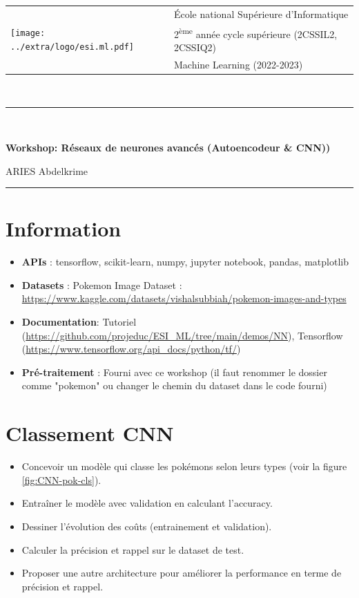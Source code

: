 \documentclass[11pt, a4paper]{article}
\begin{document}

\noindent
\begin{tabular}{ll}
\multirow{3}{*}{\texttt{[image: ../extra/logo/esi.ml.pdf]}} & \'Ecole national Supérieure d'Informatique\\
& 2\textsuperscript{ème} année cycle supérieure (2CSSIL2, 2CSSIQ2)\\
& Machine Learning (2022-2023)
\end{tabular}\\[.25cm]
\noindent\rule{\textwidth}{1pt}\\%
\begin{center}
{\LARGE \textbf{Workshop: Réseaux de neurones avanc\'es (Autoencodeur \& CNN))}}
\begin{flushright}
	ARIES Abdelkrime
\end{flushright}
\end{center}
\noindent\rule{\textwidth}{1pt}

\section*{Information}

\begin{itemize}
	\item \textbf{APIs} : tensorflow, scikit-learn, numpy, jupyter notebook, pandas, matplotlib
	\item \textbf{Datasets} : Pokemon Image Dataset : {\scriptsize\url{https://www.kaggle.com/datasets/vishalsubbiah/pokemon-images-and-types}}
	\item \textbf{Documentation}: Tutoriel ({\scriptsize \url{https://github.com/projeduc/ESI_ML/tree/main/demos/NN}}), Tensorflow ({\scriptsize \url{https://www.tensorflow.org/api_docs/python/tf/}})
	\item \textbf{Pré-traitement} : Fourni avec ce workshop (il faut renommer le dossier comme "pokemon" ou changer le chemin du dataset dans le code fourni)
\end{itemize}

\section{Classement CNN}

\begin{itemize}
	\item Concevoir un modèle qui classe les pokémons selon leurs types (voir la figure \ref{fig:CNN-pok-cls}).
	\item Entraîner le modèle avec validation en calculant l'accuracy.
	\item Dessiner l'évolution des coûts (entrainement et validation).
	\item Calculer la précision et rappel sur le dataset de test.
	\item Proposer une autre architecture pour améliorer la performance en terme de précision et rappel.
\end{itemize}
\end{document}

